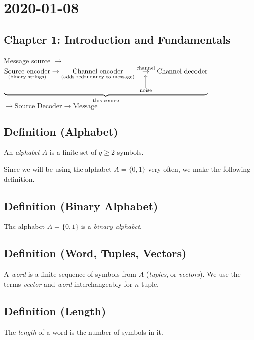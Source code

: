 \section{2020-01-08}
\subsection{Chapter 1: Introduction and Fundamentals}
Message source
$ \rightarrow $
$ \underbrace{
 \underset{\text{(binary strings)}}{\text{Source encoder}} 
 \rightarrow 
 \underset{\text{(adds redundancy to message)}}{\text{Channel encoder}} 
 \underset{\overset{\Big\uparrow}{\text{noise}}}{\overset{\text{channel}}{\rightarrow}} 
\text{Channel decoder}}_{\text{this course}}$
$ \rightarrow \text{Source Decoder} \rightarrow \text{Message} $

\begin{defbox}
    \subsection{Definition (Alphabet)}
    An \emph{alphabet} $ A $ is a finite set of $ q\ge 2 $ symbols.
\end{defbox}

Since we will be using the alphabet
$ A=\{0,1\} $ very often, we make the following definition.

\begin{defbox}
    \subsection{Definition (Binary Alphabet)}
    The alphabet $ A=\{0,1\} $ is a \emph{binary alphabet}.
\end{defbox}

\begin{defbox}
    \subsection{Definition (Word, Tuples, Vectors)}
    A \emph{word} is a finite sequence of symbols from $ A $ (\emph{tuples},
    or \emph{vectors}). We use the terms \emph{vector} and \emph{word}
    interchangeably for $ n $-tuple.
\end{defbox}

\begin{defbox}
    \subsection{Definition (Length)}
    The \emph{length} of a word is the number of symbols in it.
\end{defbox}


